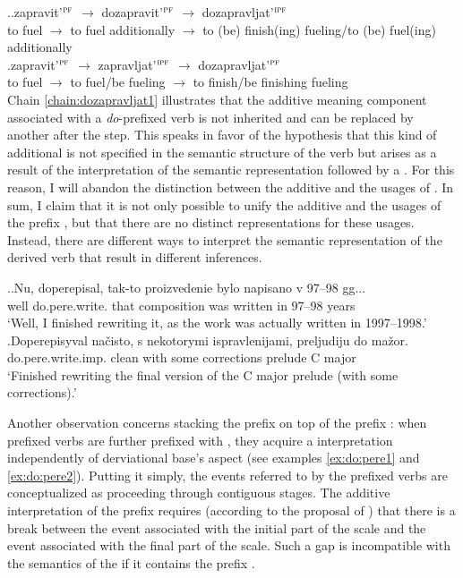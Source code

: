 \ex.\label{chain:dozapravljat}\ag.\label{chain:dozapravljat1}zapravit'$^{\textsc{pf}}$ $\rightarrow$ dozapravit'$^{\textsc{pf}}$ $\rightarrow$ dozapravljat'$^{\textsc{ipf}}$\\
{to fuel} $\rightarrow$ {to fuel additionally} $\rightarrow$ {to (be) finish(ing) fueling/to (be) fuel(ing) additionally}\\
\bg.\label{chain:dozapravljat2}zapravit'$^{\textsc{pf}}$ $\rightarrow$ zapravljat'$^{\textsc{ipf}}$ $\rightarrow$ dozapravljat'$^{\textsc{pf}}$\\
{to fuel} $\rightarrow$ {to fuel/be fueling} $\rightarrow$ {to finish/be finishing fueling}\\

Chain \ref{chain:dozapravljat1} illustrates that the additive meaning component associated with a \textit{do}-prefixed verb is not inherited and can be replaced by another  after the  step. This speaks in favor of the hypothesis that this kind of additional  is not specified in the semantic structure of the verb but arises as a result of the interpretation of the semantic representation followed by a . For this reason, I will abandon the distinction between the additive and the  usages of . In sum, I claim that it is not only possible to unify the additive and the  usages of the prefix , but that there are no distinct representations for these usages. Instead, there are different ways to interpret the semantic representation of the derived verb that result in different inferences. 

\ex.\ag.\label{ex:do:pere1}Nu, doperepisal, tak-to proizvedenie bylo napisano v 97--98 gg...\\
well do.pere.write. that composition was written in 97--98 years\\
\trans `Well, I finished rewriting it, as the work was actually written in 1997--1998.'
\bg.\label{ex:do:pere2}Doperepisyval na\v{c}isto, s nekotorymi ispravlenijami, preljudiju do ma\v{z}or.\\
do.pere.write.imp. clean with some corrections prelude C major\\
\trans `Finished rewriting the final version of the C major prelude (with some corrections).'

Another observation concerns stacking the prefix  on top of the prefix  : when prefixed verbs are further prefixed with , they acquire a  interpretation independently of derviational base's aspect (see examples \ref{ex:do:pere1} and \ref{ex:do:pere2}). Putting it simply, the events referred to by the prefixed verbs are conceptualized as proceeding through contiguous stages. The additive interpretation of the prefix  requires (according to the proposal of \citealt{Kagan:book}) that there is a break between the event associated with the initial part of the scale and the event associated with the final part of the scale. Such a gap is incompatible with the semantics of the  if it contains the prefix . 

